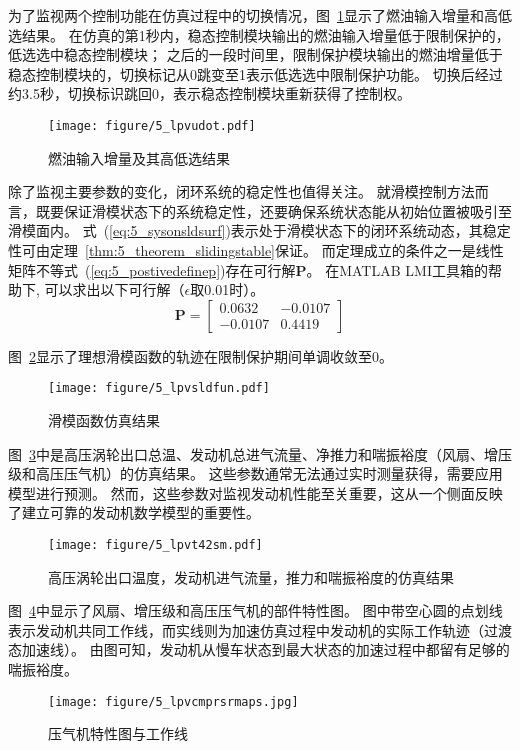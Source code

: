 \documentclass{article}
\begin{document}
为了监视两个控制功能在仿真过程中的切换情况，图~\ref{fig:5_lpvudot}显示了燃油输入增量和高低选结果。
在仿真的第1秒内，稳态控制模块输出的燃油输入增量低于限制保护的，低选选中稳态控制模块；
之后的一段时间里，限制保护模块输出的燃油增量低于稳态控制模块的，切换标记从0跳变至1表示低选选中限制保护功能。
切换后经过约3.5秒，切换标识跳回0，表示稳态控制模块重新获得了控制权。
\begin{figure}[!ht]
    \centering
    \texttt{[image: figure/5\_lpvudot.pdf]}
    \caption{燃油输入增量及其高低选结果}
    \label{fig:5_lpvudot}
\end{figure}

除了监视主要参数的变化，闭环系统的稳定性也值得关注。
就滑模控制方法而言，既要保证滑模状态下的系统稳定性，还要确保系统状态能从初始位置被吸引至滑模面内。
式~(\ref{eq:5_sysonsldsurf})表示处于滑模状态下的闭环系统动态，其稳定性可由定理~\ref{thm:5_theorem_slidingstable}保证。
而定理成立的条件之一是线性矩阵不等式~(\ref{eq:5_postivedefinep})存在可行解$\mathbf{P}$。
在MATLAB LMI工具箱的帮助下\cite{Johan2011YALMIP}, 可以求出以下可行解（$\epsilon$取0.01时）。
\begin{equation}
\mathbf{P} =
\begin{bmatrix}
 0.0632 & -0.0107\\
-0.0107 &  0.4419
\end{bmatrix}
\end{equation}

图~\ref{fig:5_lpvsldfun}显示了理想滑模函数的轨迹在限制保护期间单调收敛至0。
\begin{figure}[!ht]
    \centering
    \texttt{[image: figure/5\_lpvsldfun.pdf]}
    \caption{滑模函数仿真结果}
    \label{fig:5_lpvsldfun}
\end{figure}

图~\ref{fig:5_lpvt42sm}中是高压涡轮出口总温、发动机总进气流量、净推力和喘振裕度（风扇、增压级和高压压气机）的仿真结果。
这些参数通常无法通过实时测量获得，需要应用模型进行预测。
然而，这些参数对监视发动机性能至关重要，这从一个侧面反映了建立可靠的发动机数学模型的重要性。
\begin{figure}[!ht]
    \centering
    \texttt{[image: figure/5\_lpvt42sm.pdf]}
    \caption{高压涡轮出口温度，发动机进气流量，推力和喘振裕度的仿真结果}
    \label{fig:5_lpvt42sm}
\end{figure}

图~\ref{fig:5_lpvcmprsrmaps}中显示了风扇、增压级和高压压气机的部件特性图。
图中带空心圆的点划线表示发动机共同工作线，而实线则为加速仿真过程中发动机的实际工作轨迹（过渡态加速线）。
由图可知，发动机从慢车状态到最大状态的加速过程中都留有足够的喘振裕度。
\begin{figure}[!ht]
    \centering
    \texttt{[image: figure/5\_lpvcmprsrmaps.jpg]}
    \caption{压气机特性图与工作线}
    \label{fig:5_lpvcmprsrmaps}
\end{figure}
\end{document}
